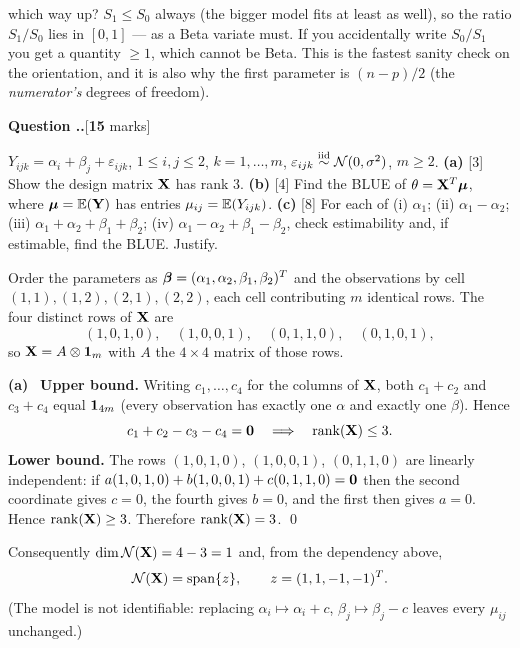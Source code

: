 \documentclass[11pt]{article}
\newcommand{\Nsp}{\mathcal{N}}
\newcounter{qq}[section]
\newcommand{\qhead}[2]{\medskip\refstepcounter{qq}%
  \noindent\textbf{\color{Blue}Question \thesection.\theqq.}\hfill\textnormal{[\textbf{#1} marks]}%
  \ifx\relax#2\relax\else\par\smallskip\fi}
\newcommand{\pt}[1]{\smallskip\noindent\textbf{(#1)}\ }
\begin{document}
\begin{confusion}{which way up?}
$S_1\le S_0$ always (the bigger model fits at least as well), so the ratio $S_1/S_0$ lies in
$[0,1]$ --- as a Beta variate must. If you accidentally write $S_0/S_1$ you get a quantity
$\ge1$, which cannot be Beta. This is the fastest sanity check on the orientation, and it is
also why the first parameter is $(n-p)/2$ (the \emph{numerator's} degrees of freedom).
\end{confusion}

\qhead{15}{}
\begin{stmt}
$Y_{ijk}=\alpha_i+\beta_j+\varepsilon_{ijk}$, $1\le i,j\le2$, $k=1,\dots,m$,
$\varepsilon_{ijk}\overset{\text{iid}}{\sim}\mathcal{N}(0,\sigma^2)$, $m\ge2$.
\textbf{(a)} [3] Show the design matrix $\mathbf{X}$ has rank 3.
\textbf{(b)} [4] Find the BLUE of $\theta=\mathbf{X}^T\boldsymbol{\mu}$, where $\boldsymbol{\mu}=\mathbb{E}(\mathbf{Y})$ has entries
$\mu_{ij}=\mathbb{E}(Y_{ijk})$.
\textbf{(c)} [8] For each of (i) $\alpha_1$; (ii) $\alpha_1-\alpha_2$;
(iii) $\alpha_1+\alpha_2+\beta_1+\beta_2$; (iv) $\alpha_1-\alpha_2+\beta_1-\beta_2$, check
estimability and, if estimable, find the BLUE. Justify.
\end{stmt}

Order the parameters as $\boldsymbol{\beta}=(\alpha_1,\alpha_2,\beta_1,\beta_2)^T$ and the observations by
cell $(1,1),(1,2),(2,1),(2,2)$, each cell contributing $m$ identical rows. The four distinct
rows of $\mathbf{X}$ are
\[
  (1,0,1,0),\quad (1,0,0,1),\quad (0,1,1,0),\quad (0,1,0,1),
\]
so $\mathbf{X}=A\otimes\mathbf{1}_m$ with $A$ the $4\times4$ matrix of those rows.

\pt{a} \textbf{Upper bound.} Writing $c_1,\dots,c_4$ for the columns of $\mathbf{X}$, both
$c_1+c_2$ and $c_3+c_4$ equal $\mathbf{1}_{4m}$ (every observation has exactly one $\alpha$ and
exactly one $\beta$). Hence
\[
  c_1+c_2-c_3-c_4=\mathbf{0} \quad\Longrightarrow\quad \operatorname{rank}(\mathbf{X})\le3 .
\]
\textbf{Lower bound.} The rows $(1,0,1,0)$, $(1,0,0,1)$, $(0,1,1,0)$ are linearly
independent: if $a(1,0,1,0)+b(1,0,0,1)+c(0,1,1,0)=\mathbf{0}$ then the second coordinate gives
$c=0$, the fourth gives $b=0$, and the first then gives $a=0$. Hence $\operatorname{rank}(\mathbf{X})\ge3$.
Therefore $\operatorname{rank}(\mathbf{X})=3$. \qed

Consequently $\dim\Nsp(\bX)=4-3=1$ and, from the dependency above,
\begin{equation}\label{eq:null}
  \Nsp(\bX)=\text{span}\{z\},\qquad z=(1,1,-1,-1)^T .
\end{equation}
(The model is not identifiable: replacing $\alpha_i\mapsto\alpha_i+c$,
$\beta_j\mapsto\beta_j-c$ leaves every $\mu_{ij}$ unchanged.)
\end{document}
